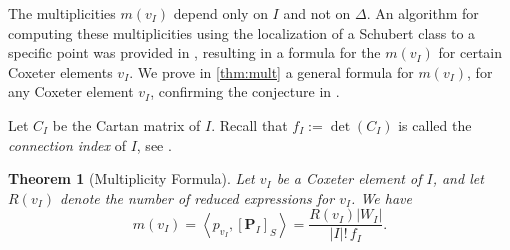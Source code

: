 \documentclass[10pt]{article}
\newtheorem{thm}{Theorem}
\numberwithin{thm}{section}
\theoremstyle{definition}
\theoremstyle{remark}
\newcommand{\Pet}{\ensuremath{\mathbf{P}}}
\begin{document}
The multiplicities $m(v_I)$ depend only on $I$ and not on $\Delta$.
An algorithm for computing these multiplicities using the localization of a Schubert class to a specific point was provided in \cite[Prop 7.3]{gms:peterson},
resulting in a formula for the $m(v_I)$ for certain Coxeter elements $v_I$.
We prove in \cref{thm:mult} a general formula for $m(v_I)$, for any Coxeter element $v_I$, confirming the conjecture in \cite[Remark 7.7]{gms:peterson}.


Let $C_I$ be the Cartan matrix of $I$.
Recall that $f_I:=\det(C_I)$ is called the \emph{connection index} of $I$, see \cite{bourbaki:Lie46}.

\begin{thm}[Multiplicity Formula]
\label{intro:thm:mult}
Let $v_I$ be a Coxeter element of $I$,
and let $R(v_I)$ denote the number of reduced expressions for $v_I$.
We have %
\begin{equation*}
m(v_I)=\left\langle p_{v_I},[\Pet_I]_S\right\rangle=\frac{R(v_I)|W_I|}{|I|!\,f_I}.
\end{equation*}
\end{thm}
\end{document}
